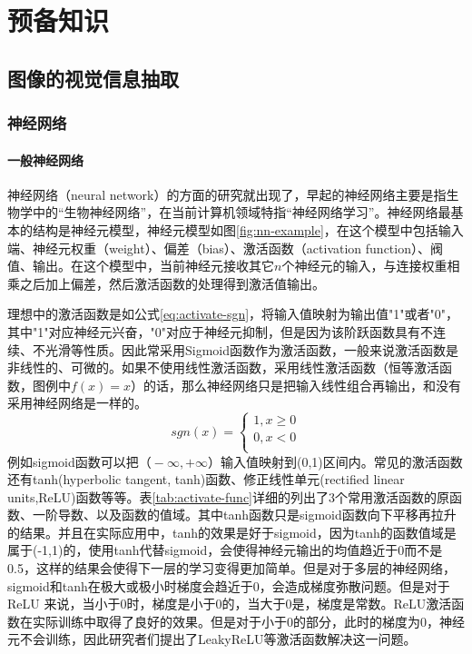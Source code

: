 
\chapter{预备知识}
\label{ch:pre}



\section{图像的视觉信息抽取}



\subsection{神经网络}

\subsubsection{一般神经网络}
神经网络（neural network）的方面的研究就出现了，早起的神经网络主要是指生物学中的``生物神经网络''，在当前计算机领域特指``神经网络学习''。神经网络最基本的结构是神经元模型，神经元模型如图\ref{fig:nn-example}，在这个模型中包括输入端、神经元权重（weight）、偏差（bias）、激活函数（activation function）、阀值、输出。在这个模型中，当前神经元接收其它$n$个神经元的输入，与连接权重相乘之后加上偏差，然后激活函数的处理得到激活值输出。

理想中的激活函数是如公式\ref{eq:activate-sgn}，将输入值映射为输出值"1"或者"0"，其中"1"对应神经元兴奋，"0"对应于神经元抑制，但是因为该阶跃函数具有不连续、不光滑等性质。因此常采用Sigmoid函数作为激活函数，一般来说激活函数是非线性的、可微的。如果不使用线性激活函数，采用线性激活函数（恒等激活函数，图例中$f(x) = x$）的话，那么神经网络只是把输入线性组合再输出，和没有采用神经网络是一样的。
\begin{equation}\label{eq:activate-sgn}
    sgn(x)=\left\{
    \begin{aligned}
    1, x\geq 0 \\
    0, x<0 \\
    \end{aligned}
    \right.
\end{equation}
例如sigmoid函数可以把$（-\infty,+\infty）$输入值映射到(0,1)区间内。常见的激活函数还有tanh(hyperbolic tangent, tanh)函数、修正线性单元(rectified linear units,ReLU)函数等等。表\ref{tab:activate-func}详细的列出了3个常用激活函数的原函数、一阶导数、以及函数的值域。其中tanh函数只是sigmoid函数向下平移再拉升的结果。并且在实际应用中，tanh的效果是好于sigmoid，因为tanh的函数值域是属于(-1,1)的，使用tanh代替sigmoid，会使得神经元输出的均值趋近于0而不是0.5，这样的结果会使得下一层的学习变得更加简单。但是对于多层的神经网络，sigmoid和tanh在极大或极小时梯度会趋近于0，会造成梯度弥散问题。但是对于ReLU 来说，当小于0时，梯度是小于0的，当大于0是，梯度是常数。ReLU激活函数在实际训练中取得了良好的效果。但是对于小于0的部分，此时的梯度为0，神经元不会训练，因此研究者们提出了LeakyReLU等激活函数解决这一问题。

